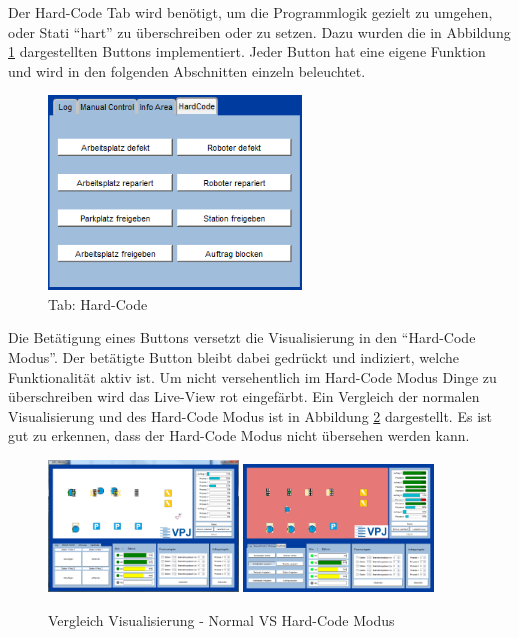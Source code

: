 Der Hard-Code Tab wird benötigt, um die Programmlogik gezielt zu umgehen, oder Stati "`hart"' zu überschreiben oder zu setzen. Dazu wurden die in Abbildung \ref{fig:HardCode} dargestellten Buttons implementiert. Jeder Button hat eine eigene Funktion und wird in den folgenden Abschnitten einzeln beleuchtet. 

\begin{figure}[htb]
    \centering
    \includegraphics[width=0.6\textwidth]{Abbildungen/HardCode.png}
    \caption{Tab: Hard-Code}		
    \label{fig:HardCode}
\end{figure}

Die Betätigung eines Buttons versetzt die Visualisierung in den "`Hard-Code Modus"'. Der betätigte Button bleibt dabei gedrückt und indiziert, welche Funktionalität aktiv ist. Um nicht versehentlich im Hard-Code Modus Dinge zu überschreiben wird das Live-View rot eingefärbt. Ein Vergleich der normalen Visualisierung und des Hard-Code Modus ist in Abbildung \ref{fig:GesamtprogrammROT} dargestellt. Es ist gut zu erkennen, dass der Hard-Code Modus nicht übersehen werden kann. 

\begin{figure}[htb]
    \centering
    \includegraphics[width=0.45\textwidth]{Abbildungen/Gesamtprogramm.png}
    \includegraphics[width=0.45\textwidth]{Abbildungen/GesamtprogrammROT.png}
    \caption{Vergleich Visualisierung - Normal VS Hard-Code Modus}		
    \label{fig:GesamtprogrammROT}
\end{figure}

